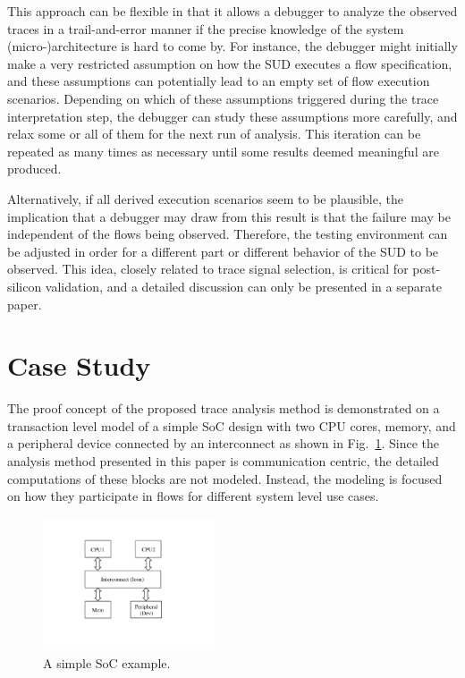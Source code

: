 \documentclass[conference]{IEEEtran}
\begin{document}
This approach can be flexible in that it allows a debugger to analyze the observed traces in a trail-and-error manner if the precise knowledge of the system (micro-)architecture is hard to come by.  For instance, the debugger might initially make a very restricted assumption on how the SUD executes a flow specification, and these assumptions can potentially lead to an empty set of flow execution scenarios.  Depending on which of these assumptions triggered during the trace interpretation step, the debugger can study these assumptions more carefully, and relax some or all of them for the next run of analysis.  This iteration can be repeated as many times as necessary until some results deemed meaningful are produced.

Alternatively, if all derived execution scenarios seem to be plausible, the implication that a debugger may draw from this result is that the failure may be independent of the flows being observed.  Therefore, the testing environment can be adjusted in order for a different part or different behavior of the SUD to be observed.  This idea, closely related to trace signal selection, is critical for post-silicon validation, and a detailed discussion can only be presented in a separate paper. 


  

\section{Case Study}

The proof concept of the proposed trace analysis method is demonstrated on a transaction level model of a simple SoC design with two CPU cores, memory, and a peripheral device connected by an interconnect as shown in Fig.~\ref{fig-SoC-ex}.  Since the analysis method presented in this paper is communication centric, the detailed computations of these blocks are not modeled.  Instead, the modeling is focused on how they participate in flows for different system level use cases.

\begin{figure}[tb]
\begin{center}
\includegraphics[width=2in]{figures/simple-ex}
\caption{A simple SoC example.}
\label{fig-SoC-ex}
\end{center}
\end{figure}
\end{document}
